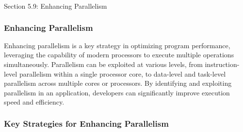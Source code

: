 \begin{notes}{Section 5.9: Enhancing Parallelism}
    \subsubsection*{Enhancing Parallelism}

    Enhancing parallelism is a key strategy in optimizing program performance, leveraging the capability of modern processors to execute multiple operations simultaneously. Parallelism can be exploited 
    at various levels, from instruction-level parallelism within a single processor core, to data-level and task-level parallelism across multiple cores or processors. By identifying and exploiting 
    parallelism in an application, developers can significantly improve execution speed and efficiency. \vspace*{1em}
    
    \subsubsection*{Key Strategies for Enhancing Parallelism}
    

\end{notes}
